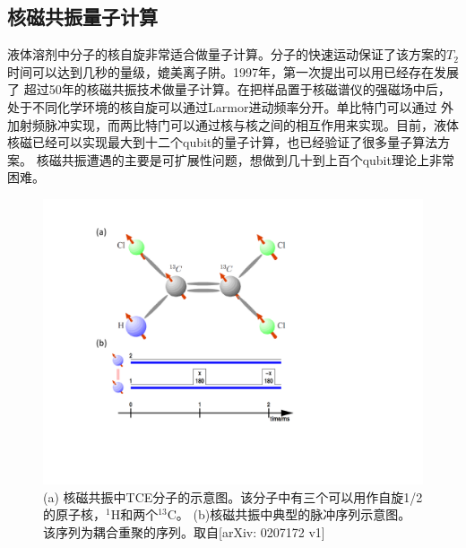 \subsection{核磁共振量子计算}
液体溶剂中分子的核自旋非常适合做量子计算。分子的快速运动保证了该方案的$T_2$时间可以达到几秒的量级，媲美离子阱。1997年，第一次提出可以用已经存在发展了
超过50年的核磁共振技术做量子计算\cite{nmrpro1,nmrpro2}。在把样品置于核磁谱仪的强磁场中后，处于不同化学环境的核自旋可以通过Larmor进动频率分开。单比特门可以通过
外加射频脉冲实现，而两比特门可以通过核与核之间的相互作用来实现。目前，液体核磁已经可以实现最大到十二个qubit的量子计算\cite{12qubit}，也已经验证了很多量子算法方案\cite{shor15}。
核磁共振遭遇的主要是可扩展性问题，想做到几十到上百个qubit理论上非常困难。
\begin{figure}[htbp]
            \begin{center}
              \includegraphics[width= 0.8\columnwidth]{figures/nmr.pdf}
              \caption{(a) 核磁共振中TCE分子的示意图。该分子中有三个可以用作自旋1/2的原子核，$^1$H和两个$^{13}$C。 (b)核磁共振中典型的脉冲序列示意图。该序列为耦合重聚的序列。取自[arXiv: 0207172 v1\cite{nmrreview1}]
              }
              \label{nmr}
            \end{center}
  \end{figure}

